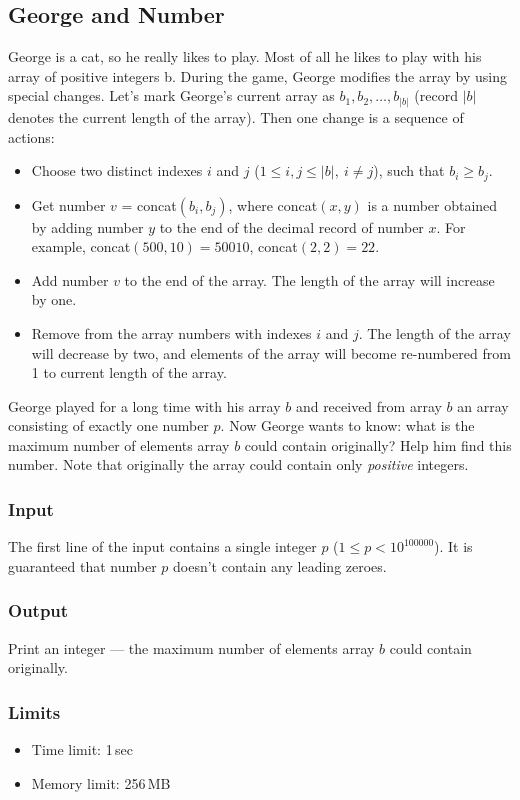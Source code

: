 \subsection{George and Number}

George is a cat, so he really likes to play.
Most of all he likes to play with his array of positive integers b.
During the game, George modifies the array by using special changes.
Let's mark George's current array as $b_1,b_2,\ldots,b_{|b|}$
(record $|b|$ denotes the current length of the array).
Then one change is a sequence of actions: 
\begin{itemize}
    \item Choose two distinct indexes $i$ and $j$
        ($1\leq i,j \leq |b|,\ i \neq j$), such that $b_i \geq b_j$.
    \item Get number $v$ = concat$(b_i,b_j)$,
        where concat$(x,y)$ is a number obtained by adding number $y$
        to the end of the decimal record of number $x$.
        For example, concat$(500,10)=50010$, concat$(2,2)=22$.
    \item Add number $v$ to the end of the array.
        The length of the array will increase by one.
    \item Remove from the array numbers with indexes $i$ and $j$.
        The length of the array will decrease by two,
        and elements of the array will become re-numbered
        from 1 to current length of the array.
\end{itemize}
George played for a long time with his array $b$ and received from array $b$
an array consisting of exactly one number $p$.
Now George wants to know: what is the maximum number of elements array $b$
could contain originally?
Help him find this number.
Note that originally the array could contain only \emph{positive} integers.

\subsubsection*{Input}
The first line of the input contains a single integer $p$
($1 \leq p < 10^{100000}$).
It is guaranteed that number $p$ doesn't contain any leading zeroes.

\subsubsection*{Output}
Print an integer --- the maximum number of elements array $b$
could contain originally.

\subsubsection*{Limits}
\begin{itemize}
    \item Time limit: 1\,sec
    \item Memory limit: 256\,MB
\end{itemize}

